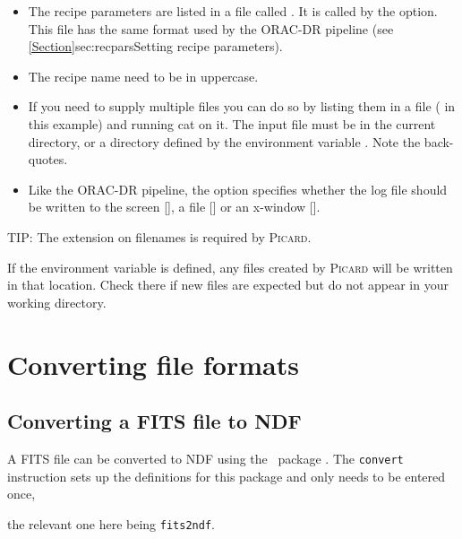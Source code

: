 \documentclass[11pt,oneside,chapters]{starlink}
\begin{document}
\begin{itemize}
\item The recipe parameters are listed in a file called .
It is called by the  option. This file has the same
 format used by the ORAC-DR pipeline (see
\cref{Section}{sec:recpars}{Setting recipe parameters}).
\item The recipe name need to be in uppercase.
\item If you need to supply multiple files you can do so by listing
them in a file ( in this example) and running cat on it.
The input file must be in the current directory, or a directory
defined by the environment variable . Note the
back-quotes.
\item Like the ORAC-DR pipeline, the  option specifies
whether the log file should be written to the screen [], a
file [] or an x-window [].
\end{itemize}

\begin{tip}
TIP: The  extension on filenames is required by \textsc{Picard}.
\end{tip}

\begin{tip}
If the environment variable  is defined, any files
created by \textsc{Picard} will be written in that location. Check there if new
files are expected but do not appear in your working directory.
\end{tip}

\newpage
\chapter{Converting file formats}
\label{app:convert}

\section{Converting a FITS file to NDF}

A FITS file can be converted to NDF using the \starlink\ package
\convert.  The \texttt{convert} instruction sets up the definitions
for this package and only needs to be entered once,

\begin{terminalv}
\end{terminalv}

the relevant one here being \texttt{fits2ndf}.
\end{document}
